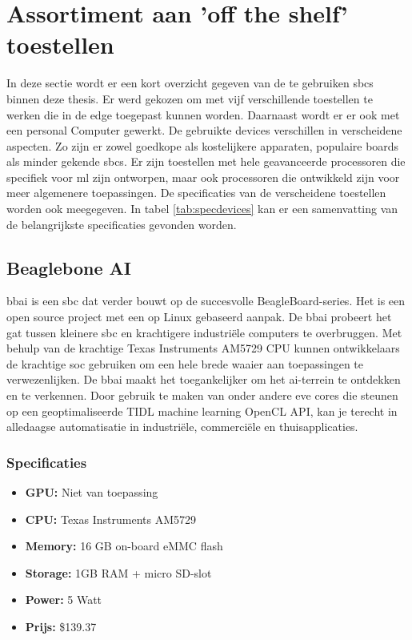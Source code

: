 
\newpage


\section{Assortiment aan 'off the shelf' toestellen}
In deze sectie wordt er een kort overzicht gegeven van de te gebruiken \gls{sbc}s binnen deze thesis. Er werd gekozen om met vijf verschillende toestellen te werken die in de edge toegepast kunnen worden. Daarnaast wordt er er ook met een personal Computer gewerkt. De gebruikte devices verschillen in verscheidene aspecten. Zo zijn er zowel goedkope als kostelijkere apparaten, populaire boards als minder gekende \gls{sbc}s. Er zijn toestellen met hele geavanceerde processoren die specifiek voor \gls{ml} zijn ontworpen, maar ook processoren die ontwikkeld zijn voor meer algemenere toepassingen. De specificaties van de verscheidene toestellen worden ook meegegeven. In tabel \ref{tab:specdevices} kan er een samenvatting van de belangrijkste specificaties gevonden worden.

	\subsection{Beaglebone AI}
	\gls{bbai} is een \gls{sbc} dat verder bouwt op de succesvolle  BeagleBoard-series\citep{bron:bbai}. Het is een open source project met een op Linux gebaseerd aanpak. De \gls{bbai} probeert het gat tussen kleinere \gls{sbc} en krachtigere industri\"ele computers te overbruggen. Met behulp van de krachtige Texas Instruments AM5729 CPU kunnen ontwikkelaars de krachtige \gls{soc} gebruiken om een hele brede waaier aan toepassingen te verwezenlijken. De \gls{bbai} maakt het toegankelijker om het \gls{ai}-terrein te ontdekken en te verkennen. Door gebruik te maken van onder andere \gls{eve} cores die steunen op een geoptimaliseerde TIDL machine learning OpenCL API, kan je terecht in alledaagse automatisatie in industri\"ele, commerci\"ele en thuisapplicaties.
	
	
	\subsubsection{Specificaties}
	\begin{itemize}
		\item \textbf{GPU:} Niet van toepassing
		\item \textbf{CPU:} Texas Instruments AM5729
		\item \textbf{Memory:} 16 GB on-board eMMC flash
		\item \textbf{Storage:} 1GB RAM + micro SD-slot
		\item \textbf{Power:} 5 Watt
		\item \textbf{Prijs:} \$139.37
	\end{itemize}
	
